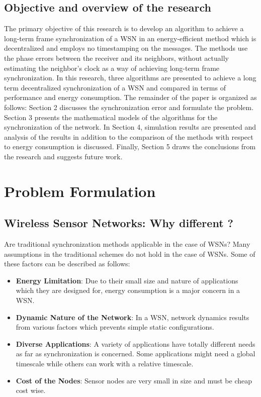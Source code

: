 \documentclass[journal]{IEEEtran}
\begin{document}
\subsection{\textbf{Objective and overview of the research}}\noindent
The primary objective of this research is to develop an algorithm to achieve a long-term frame synchronization of a WSN in an energy-efficient method which is decentralized and employs no timestamping on the messages. The methods use the phase errors
between the receiver and its neighbors, without actually estimating the neighbor's clock as a way of achieving long-term frame synchronization. In this research, three algorithms are presented to achieve a long term decentralized synchronization of a WSN and compared in terms of performance and energy consumption. 
\newline The remainder of the paper is organized as follows:  Section 2 discusses the synchronization error and formulate the problem. Section 3 presents the mathematical models of the algorithms for the synchronization of the network. In Section 4, simulation results are presented and analysis of the results in addition to the comparison of the methods with respect to energy consumption is discussed. Finally, Section 5 draws the conclusions from the research and suggests future work.
\section{\textbf{Problem Formulation}}
\subsection{\textbf{Wireless Sensor Networks: Why different ?}}
\noindent Are traditional synchronization methods applicable in the case of WSNs? Many
assumptions in the traditional schemes do not hold in the case
of WSNs. Some of these factors can be described as follows:
\begin{itemize}
\item \textbf{Energy Limitation}: Due to their small size and nature of applications which they
are designed for, energy consumption is a major concern in a WSN.
\item \textbf{Dynamic Nature of the Network}: In a WSN, network
dynamics results from various factors which prevents simple
static configurations.
\item \textbf{Diverse Applications}: A variety of applications 
have totally different needs as far as synchronization is concerned.
Some applications might need a global timescale while
others can work with a relative timescale.
\item \textbf{Cost of the Nodes}: Sensor nodes are very small in size
and must be cheap cost wise.
\end{itemize}
\end{document}
